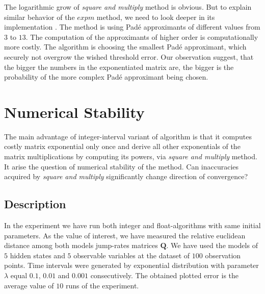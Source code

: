 \documentclass[thesis=M,english]{FITthesis}[2012/10/20]
\newcommand{\matr}[1]{\mathbf{#1}}
\begin{document}
The logarithmic grow of \textit{square and multiply} method is obvious. But to explain similar behavior of the $expm$ method, we need to look deeper in its implementation \cite{Sc01}. %
The method is using Pad\'{e} approximants of different values from $3$ to $13$. The computation of the approximants of higher order is computationally more costly. The algorithm is choosing the smallest  Pad\'{e} approximant, which securely not overgrow the wished threshold error. Our observation suggest, that the bigger the numbers in the exponentiated matrix are, the bigger is the probability of the more complex Pad\'{e} approximant being chosen.   %



\section{Numerical Stability}\label{sec:ns} 

The main advantage of integer-interval variant of algorithm is that it computes costly matrix exponential only once and derive all other exponentials of the matrix multiplications by computing its powers, via \textit{square and multiply} method. It arise the question of numerical stability of the method. Can inaccuracies acquired by \textit{square and multiply} significantly change direction of convergence?   

\subsection*{ Description }
In the experiment we have run both integer and float-algorithms with same initial parameters. As the value of interest, we have measured the relative euclidean distance among both models jump-rates matrices $\matr{Q}$. We have used the models of $5$ hidden states and $5$ observable variables at the dataset of $100$ observation points. Time intervals were generated by exponential distribution with parameter $\lambda$ equal $0.1$, $0.01$ and $0.001$ consecutively. The obtained plotted error is the average value of $10$ runs of the experiment.      
\end{document}
